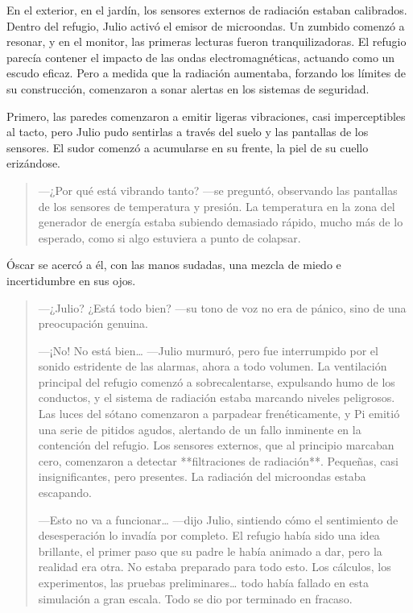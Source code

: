 \documentclass[a4paper,12pt]{book}
\begin{document}
En el exterior, en el jardín, los sensores externos de radiación estaban calibrados. Dentro del refugio, Julio activó el emisor de microondas. Un zumbido comenzó a resonar, y en el monitor, las primeras lecturas fueron tranquilizadoras. El refugio parecía contener el impacto de las ondas electromagnéticas, actuando como un escudo eficaz. Pero a medida que la radiación aumentaba, forzando los límites de su construcción, comenzaron a sonar alertas en los sistemas de seguridad.

Primero, las paredes comenzaron a emitir ligeras vibraciones, casi imperceptibles al tacto, pero Julio pudo sentirlas a través del suelo y las pantallas de los sensores. El sudor comenzó a acumularse en su frente, la piel de su cuello erizándose.

\begin{quote}
    —¿Por qué está vibrando tanto? —se preguntó, observando las pantallas de los sensores de temperatura y presión. La temperatura en la zona del generador de energía estaba subiendo demasiado rápido, mucho más de lo esperado, como si algo estuviera a punto de colapsar.
\end{quote}

Óscar se acercó a él, con las manos sudadas, una mezcla de miedo e incertidumbre en sus ojos.

\begin{quote}
    —¿Julio? ¿Está todo bien? —su tono de voz no era de pánico, sino de una preocupación genuina.

    —¡No! No está bien… —Julio murmuró, pero fue interrumpido por el sonido estridente de las alarmas, ahora a todo volumen. La ventilación principal del refugio comenzó a sobrecalentarse, expulsando humo de los conductos, y el sistema de radiación estaba marcando niveles peligrosos. Las luces del sótano comenzaron a parpadear frenéticamente, y Pi emitió una serie de pitidos agudos, alertando de un fallo inminente en la contención del refugio. Los sensores externos, que al principio marcaban cero, comenzaron a detectar **filtraciones de radiación**. Pequeñas, casi insignificantes, pero presentes. La radiación del microondas estaba escapando.

    —Esto no va a funcionar… —dijo Julio, sintiendo cómo el sentimiento de desesperación lo invadía por completo. El refugio había sido una idea brillante, el primer paso que su padre le había animado a dar, pero la realidad era otra. No estaba preparado para todo esto. Los cálculos, los experimentos, las pruebas preliminares… todo había fallado en esta simulación a gran escala. Todo se dio por terminado en fracaso.
\end{quote}
\end{document}
